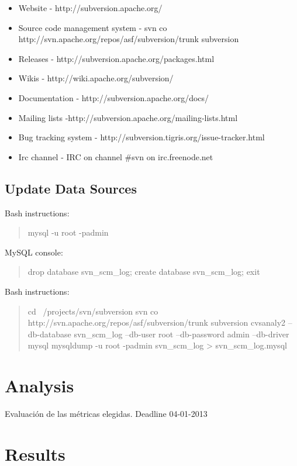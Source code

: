 \documentclass[11pt]{scrartcl}
\begin{document}
\begin{itemize}
    \item Website - http://subversion.apache.org/
    \item Source code management system - svn co http://svn.apache.org/repos/asf/subversion/trunk subversion
    \item Releases - http://subversion.apache.org/packages.html
    \item Wikis - http://wiki.apache.org/subversion/
    \item Documentation - http://subversion.apache.org/docs/
    \item Mailing lists -http://subversion.apache.org/mailing-lists.html
    \item Bug tracking system - http://subversion.tigris.org/issue-tracker.html
    \item Irc channel - IRC on channel \#svn on irc.freenode.net
\end{itemize}

\subsection{Update Data Sources}

Bash instructions:

\begin{quote}
    mysql -u root -padmin
\end{quote}

MySQL console:

\begin{quote}
    drop database svn\_scm\_log;
    create database svn\_scm\_log;
    exit
\end{quote}

Bash instructions:

\begin{quote}
    cd ~/projects/svn/subversion
    svn co http://svn.apache.org/repos/asf/subversion/trunk subversion
    cvsanaly2 --db-database svn\_scm\_log --db-user root --db-password admin --db-driver mysql
    mysqldump -u root -padmin svn\_scm\_log > svn\_scm\_log.mysql
\end{quote}

\section{Analysis}

Evaluación de las métricas elegidas.
Deadline 04-01-2013

\section{Results}
\end{document}

